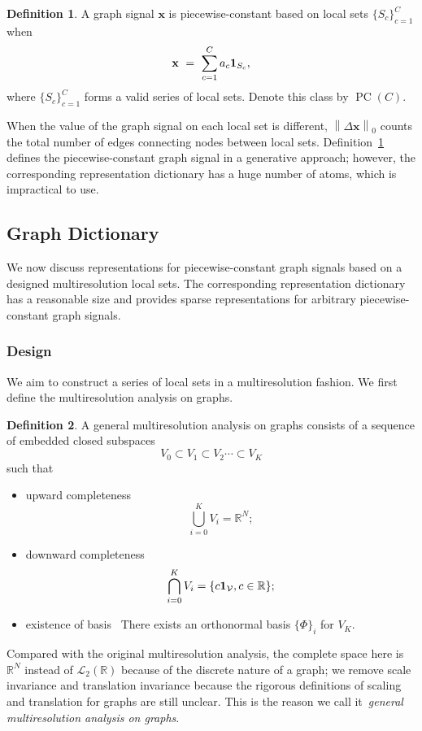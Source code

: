 \documentclass[journal,twocolumn,10pt]{IEEEtran}
\theoremstyle{definition}
\newtheorem{defn}{Definition}
\newcommand{\R}{\ensuremath{\mathbb{R}}}
\def\x{\mathbf{x}}
\def\V{\mathcal{V}}
\DeclareMathOperator{\PC}{PC}
\begin{document}
\begin{defn}
  \label{df:pc_gen}
A graph signal $\x$ is piecewise-constant based on local sets $\{S_c\}_{c=1}^C$ when
\begin{equation*}
	\x \ = \  \sum_{c=1}^C a_c {\bf 1}_{S_c},
\end{equation*}
where $\{S_c\}_{c=1}^C$ forms a valid series of local sets. Denote this class by $\PC(C)$. 
\end{defn}

When the value of the graph signal on each local set is different, $\left\| \Delta \x  \right\|_0$ counts the total number of edges connecting nodes between local sets. Definition~\ref{df:pc_gen} defines the piecewise-constant graph signal in a generative approach; however, the corresponding representation dictionary has a huge number of atoms, which is impractical to use. 


\subsection{Graph Dictionary}
We now discuss representations for piecewise-constant graph signals based on a designed multiresolution local sets. The corresponding representation dictionary has a reasonable size and provides sparse representations for arbitrary piecewise-constant graph signals.


\subsubsection{Design}
\label{sec:Dict_LSPC}
We aim to construct a series of local sets in a multiresolution fashion. We first define the multiresolution analysis on graphs.
\begin{defn}
\label{df:MRA}
A general multiresolution analysis on graphs consists of a sequence of embedded closed subspaces
\begin{equation*}
V_0 \subset  V_{1}  \subset V_{2}  \cdots \subset V_{K}
\end{equation*}
such that
\begin{itemize}
\item upward completeness
  \begin{equation*}
  		\bigcup_{i=0}^K  V_{i} = \R^N;
  \end{equation*}
\item downward completeness
  \begin{equation*}
  		\bigcap_{i=0}^K  V_{i} = \{ c {\bf 1_{\V}}, c \in \R \};
  \end{equation*}
\item existence of basis \  There exists an orthonormal basis $\{\Phi\}_{i}$ for $V_K$.
\end{itemize}
\end{defn}
Compared with the original multiresolution analysis, the complete space here is $\R^N$ instead of $\mathcal{L}_2(\R)$
because of the discrete nature of a graph; we remove scale invariance and translation invariance because the rigorous definitions of scaling and translation for graphs are still unclear. This is the reason we call it~\emph{general multiresolution analysis on graphs}.
\end{document}
